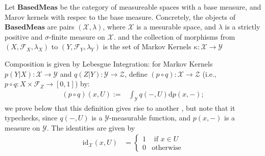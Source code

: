 \documentclass[twoside]{article} %
\theoremstyle{plain}
\theoremstyle{definition}
\newcommand{\BaseMeas}{\mathbf{BasedMeas}}
\begin{document}
    \begin{defn}
        Let $\BaseMeas$ be the category of measureable spaces with a base measure, and Marov kernels with respec to the base measure.
        Concretely,
        the objects of $\BaseMeas$ are pairs $(\mathcal X, \lambda)$, where $\mathcal X$ is a mesurable space, and $\lambda$ is a strictly positive and $\sigma$-finite measure on $\mathcal X$.
        and the collection of morphisms from 
        $(X,\mathcal F_X, \lambda_X)$ to $(Y, \mathcal F_Y, \lambda_Y)$ is the 
        set of Markov Kernels $\kappa : \mathcal X \to \mathcal Y$
        
        Composition is given by Lebesgue Integration: for Markov Kernels $p(Y|X) : \mathcal X \to \mathcal Y$ and $q(Z|Y) : \mathcal Y \to \mathcal Z$, define
        $(p \circ q) : \mathcal X \to \mathcal Z$  (i.e., $p \circ q : X \times \mathcal F_Z \to [0,1]$) by:
        \begin{align*}
            (p\circ q)(x, U) :=& \int_{\mathcal Y}
                q(-, U)
                \mathrm d p(x,-);
        \end{align*}
        we prove below that this definition gives rise to another , but note that it typechecks, since $q(-,U)$ is a $\mathcal Y$-measurable function, and $p(x,-)$ is a measure on $\mathcal Y$. 
        The identities are given by
        \begin{align*}
        \mathrm{id}_{\mathcal X}(x, U) &= \begin{cases}
                1 & \text{ if }x \in U \\ 0 & \text{otherwise}
            \end{cases}
        \end{align*}
    \end{defn}
    
\end{document}
